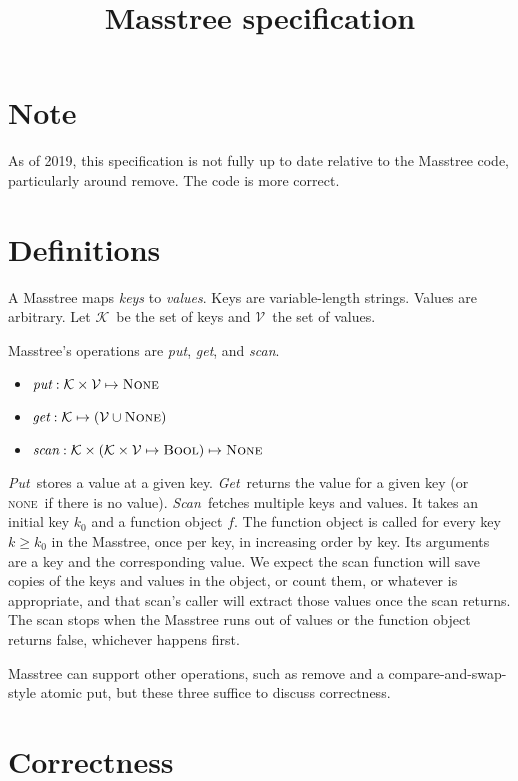 \documentclass[11pt]{article}
\title{Masstree specification}
\date{}
\newcommand{\Keyset}{\ensuremath{\mathcal K}}
\newcommand{\Valueset}{\ensuremath{\mathcal V}}
\newcommand{\None}{\textsc{None}}
\newcommand{\NONE}{\textsc{none}}
\newcommand{\Bool}{\textsc{Bool}}
\newcommand{\sysGet}{\textit{Get}}
\newcommand{\sysget}{\textit{get}}
\newcommand{\sysPut}{\textit{Put}}
\newcommand{\sysput}{\textit{put}}
\newcommand{\sysScan}{\textit{Scan}}
\newcommand{\sysscan}{\textit{scan}}
\begin{document}
\maketitle

\section*{Note}

As of 2019, this specification is not fully up to date relative to the
Masstree code, particularly around remove. The code is more correct.

\section{Definitions}

A Masstree maps \emph{keys} to \emph{values}. Keys are variable-length strings. Values are arbitrary.
Let \Keyset\ be the set of keys and \Valueset\ the set of values.

Masstree's operations are \sysput, \sysget, and \sysscan.

\begin{itemize}
\item \(\sysput : \Keyset \times \Valueset \mapsto \None\)
\item \(\sysget : \Keyset \mapsto (\Valueset \cup \None)\)
\item \(\sysscan : \Keyset \times (\Keyset \times \Valueset \mapsto \Bool) \mapsto \None\)
\end{itemize}

\noindent%
\sysPut\
stores a value at a given key. \sysGet\ returns the value for a given
key (or \NONE\ if there is no value). \sysScan\ fetches multiple keys
and values. It takes an initial key $k_0$ and a function object $f$.
The function object is called for every key $k \geq k_0$ in the
Masstree, once per key, in increasing order by key. Its arguments are
a key and the corresponding value. We expect the scan function will
save copies of the keys and values in the object, or count them, or
whatever is appropriate, and that scan's caller will extract those
values once the scan returns. The scan stops when the Masstree
runs out of values or the function object returns false, whichever
happens first.

Masstree can support other operations, such as remove and a compare-and-swap-style atomic put, but these three suffice to discuss correctness.


\section{Correctness}
\end{document}
